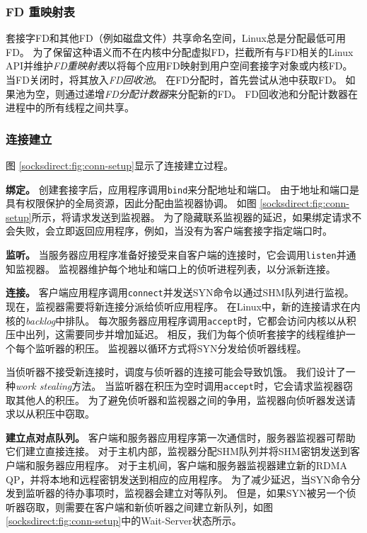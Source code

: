 \subsubsection{FD 重映射表}
\label{socksdirect:subsubsec:fd-remapping-table}



套接字FD和其他FD（例如磁盘文件）共享命名空间，Linux总是分配最低可用FD。
为了保留这种语义而不在内核中分配虚拟FD，\libipc {}拦截所有与FD相关的Linux API并维护\emph {FD重映射表}以将每个应用FD映射到用户空间套接字对象或内核FD。
当FD关闭时，\libipc {}将其放入\emph {FD回收池}。
在FD分配时，\libipc {}首先尝试从池中获取FD。
如果池为空，则通过递增\emph {FD分配计数器}来分配新的FD。
FD回收池和分配计数器在进程中的所有线程之间共享。

\subsubsection{连接建立}


图 \ref {socksdirect:fig:conn-setup}显示了连接建立过程。

\textbf{绑定。}
创建套接字后，应用程序调用\texttt {bind}来分配地址和端口。
由于地址和端口是具有权限保护的全局资源，因此分配由监视器协调。
如图 \ref {socksdirect:fig:conn-setup}所示，\libipc {}将请求发送到监视器。
为了隐藏联系监视器的延迟，如果绑定请求不会失败，\libipc {}会立即返回应用程序，例如，当没有为客户端套接字指定端口时。

\textbf{监听。}
当服务器应用程序准备好接受来自客户端的连接时，它会调用\texttt {listen}并通知监视器。
监视器维护每个地址和端口上的侦听进程列表，以分派新连接。


\textbf{连接。}
客户端应用程序调用\texttt {connect}并发送SYN命令以通过SHM队列进行监视。
现在，监视器需要将新连接分派给侦听应用程序。
在Linux中，新的连接请求在内核的\emph {backlog}中排队。
每次服务器应用程序调用\texttt {accept}时，它都会访问内核以从积压中出列，这需要同步并增加延迟。
相反，我们为每个侦听套接字的线程维护一个每个监听器的积压。
监视器以循环方式将SYN分发给侦听器线程。

当侦听器不接受新连接时，调度与侦听器的连接可能会导致饥饿。
我们设计了一种\emph {work stealing}方法。
当监听器在积压为空时调用\texttt {accept}时，它会请求监视器窃取其他人的积压。
为了避免侦听器和监视器之间的争用，监视器向侦听器发送请求以从积压中窃取。

\textbf {建立点对点队列。}
客户端和服务器应用程序第一次通信时，服务器监视器可帮助它们建立直接连接。
对于主机内部，监视器分配SHM队列并将SHM密钥发送到客户端和服务器应用程序。
对于主机间，客户端和服务器监视器建立新的RDMA QP，并将本地和远程密钥发送到相应的应用程序。
为了减少延迟，当SYN命令分发到监听器的待办事项时，监视器会建立对等队列。
但是，如果SYN被另一个侦听器窃取，则需要在客户端和新侦听器之间建立新队列，如图 \ref {socksdirect:fig:conn-setup}中的Wait-Server状态所示。

